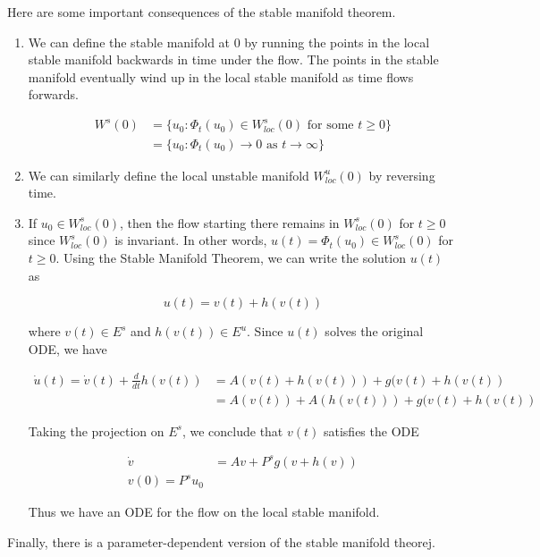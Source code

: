 \documentclass{article}
\begin{document}
Here are some important consequences of the stable manifold theorem.
\begin{enumerate}

\item We can define the stable manifold at 0 by running the points in the local stable manifold backwards in time under the flow. The points in the stable manifold eventually wind up in the local stable manifold as time flows forwards.

\begin{align*}
W^s(0) &= \{ u_0 : \Phi_t(u_0) \in W^s_{loc}(0) \text{ for some }t\geq 0 \}\\
&= \{ u_0 : \Phi_t(u_0) \rightarrow 0 \text{ as } t \rightarrow \infty \} 
\end{align*}

\item We can similarly define the local unstable manifold $W^u_{loc}(0)$ by reversing time.

\item If $u_0 \in W^s_{loc}(0)$, then the flow starting there remains in $W^s_{loc}(0)$ for $t \geq 0$ since $W^s_{loc}(0)$ is invariant. In other words, $u(t) = \Phi_t(u_0) \in W^s_{loc}(0)$ for $t \geq 0$. Using the Stable Manifold Theorem, we can write the solution $u(t)$ as

\[
u(t) = v(t) + h(v(t))
\]

where $v(t) \in E^s$ and $h(v(t)) \in E^u$. Since $u(t)$ solves the original ODE, we have

\begin{align*}
\dot{u}(t) = \dot{v}(t) + \frac{d}{dt}h(v(t)) 
&= A(v(t) + h(v(t)) ) + g(v(t) + h(v(t)) \\
&= A(v(t)) + A(h(v(t))) + g(v(t) + h(v(t))
\end{align*}

Taking the projection on $E^s$, we conclude that $v(t)$ satisfies the ODE

\begin{align*}
\dot{v} &= Av + P^s g(v + h(v)) \\
v(0) = P^s u_0
\end{align*}

Thus we have an ODE for the flow on the local stable manifold.

\end{enumerate}

Finally, there is a parameter-dependent version of the stable manifold theorej.
\end{document}
